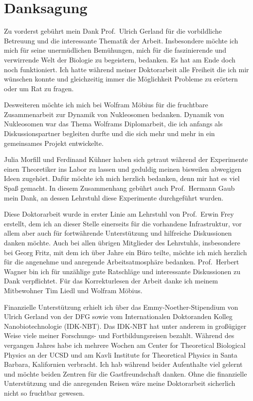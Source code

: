 \chapter*{Danksagung}

Zu vorderst geb\"uhrt mein Dank Prof.~Ulrich Gerland f\"ur die vorbildliche Betreuung und die interessante
Thematik der Arbeit. Insbesondere m\"ochte ich mich f\"ur seine unerm\"udlichen Bem\"uhungen,
mich f\"ur die faszinierende und verwirrende Welt der Biologie zu begeistern, bedanken. Es hat am Ende 
doch noch funktioniert. Ich hatte w\"ahrend meiner Doktorarbeit alle Freiheit die ich mir w\"unschen konnte
und gleichzeitig immer die M\"oglichkeit Probleme zu er\"ortern oder um Rat zu fragen. 

Desweiteren m\"ochte ich mich bei Wolfram M\"obius f\"ur die fruchtbare Zusammenarbeit zur Dynamik 
von Nukleosomen bedanken. Dynamik von Nukleosomen war das Thema Wolframs Diplomarbeit, die ich anfangs
als Diskussionspartner begleiten durfte und die sich mehr und mehr in ein gemeinsames Projekt entwickelte. 

Julia Morfill und Ferdinand K\"uhner haben sich getraut w\"ahrend der Experimente einen 
Theoretiker ins Labor zu lassen und geduldig meinen bisweilen abwegigen Ideen zugeh\"ort. 
Daf\"ur m\"ochte ich mich 
herzlich bedanken, denn mir hat es viel Spa\ss {} gemacht. In diesem Zusammenhang geb\"uhrt auch Prof.~Hermann Gaub mein Dank, an dessen Lehrstuhl diese Experimente durchgef\"uhrt wurden.

Diese Doktorarbeit wurde in erster Linie am Lehrstuhl von Prof.~Erwin Frey erstellt, dem ich an dieser
Stelle einerseits f\"ur die vorhandene Infrastruktur, vor allem aber auch f\"ur fortw\"ahrende Unterst\"utzung
und hilfreiche Diskussionen danken m\"ochte. Auch bei allen \"ubrigen Mitglieder des Lehrstuhls, insbesondere
bei Georg Fritz, mit dem ich \"uber Jahre ein B\"uro teilte, m\"ochte ich mich herzlich f\"ur die angenehme 
und anregende Arbeitsatmosph\"are bedanken. Prof.~Herbert Wagner bin ich f\"ur unz\"ahlige gute Ratschl\"age
und interessante Diskussionen zu Dank verpflichtet. F\"ur das Korrekturlesen der Arbeit danke ich meinem Mitbewohner
Tim Liedl und Wolfram M\"obius. 

Finanzielle Unterst\"utzung erhielt ich \"uber das Emmy-Noether-Stipendium von Ulrich Gerland von der DFG
sowie vom Internationalen Doktoranden Kolleg Nanobiotechnologie (IDK-NBT). Das IDK-NBT hat unter anderem
in gro\ss\"ugiger Weise viele meiner Forschungs- und Fortbildungsreisen bezahlt. W\"ahrend des 
vergangen Jahres habe ich mehrere Wochen am Center for Theoretical Biological Physics 
an der UCSD und am Kavli Institute for Theoretical Physics in Santa Barbara, Kalifornien verbracht. 
Ich hab w\"ahrend beider Aufenthalte viel gelernt und m\"ochte beiden Zentren f\"ur die Gastfreundschaft
danken. Ohne die finanzielle Unterst\"utzung und die anregenden Reisen
w\"are meine Doktorarbeit sicherlich nicht so fruchtbar gewesen. 